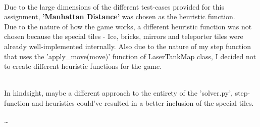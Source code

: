 \documentclass[11pt,a4paper,noindent]{article}
\begin{document}
\noindent \\ Due  to the large dimensions of the different test-cases provided for this assignment, \textbf{'Manhattan Distance'} was chosen as the heuristic function. \\
Due to the nature of how the game works, a different heuristic function was not chosen because the special tiles - Ice, bricks, mirrors and teleporter tiles were already well-implemented internally. Also due to the nature of my step function that uses the 'apply\_move(move)' function of LaserTankMap class, I decided not to create different heuristic functions for the game.

\noindent \\ In hindsight, maybe a different approach to the entirety of the 'solver.py', step-function and heuristics could've resulted in a better inclusion of the special tiles.

\newpage\ldots %
\end{document}
